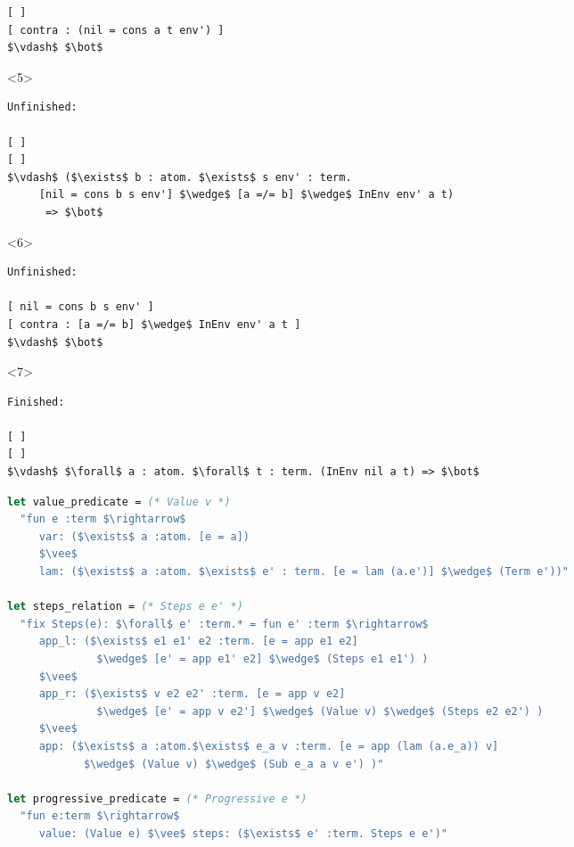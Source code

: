 \documentclass[aspectratio=169]{beamer}
\begin{document}
\begin{frame}[fragile]
\begin{overlayarea}{\linewidth}{2cm}
\begin{onlyenv}
\begin{lstlisting}[mathescape]
[ ]
[ contra : (nil = cons a t env') ]
$\vdash$ $\bot$
\end{lstlisting}
\end{onlyenv}
  \begin{onlyenv}<5>
  \begin{lstlisting}[mathescape]
Unfinished:

[ ]
[ ]
$\vdash$ ($\exists$ b : atom. $\exists$ s env' : term.
     [nil = cons b s env'] $\wedge$ [a =/= b] $\wedge$ InEnv env' a t)
      => $\bot$
\end{lstlisting}
\end{onlyenv}
  \begin{onlyenv}<6>
  \begin{lstlisting}[mathescape]
Unfinished:

[ nil = cons b s env' ]
[ contra : [a =/= b] $\wedge$ InEnv env' a t ]
$\vdash$ $\bot$
\end{lstlisting}
\end{onlyenv}
  \begin{onlyenv}<7>
  \begin{lstlisting}[mathescape]
Finished:

[ ]
[ ]
$\vdash$ $\forall$ a : atom. $\forall$ t : term. (InEnv nil a t) => $\bot$
\end{lstlisting}
\end{onlyenv}
\end{overlayarea}
\end{frame}

\begin{frame}[fragile]
\begin{lstlisting}[mathescape,language=OCaml,escapebegin=\color{codepurple}]
let value_predicate = (* Value v *)
  "fun e :term $\rightarrow$
     var: ($\exists$ a :atom. [e = a])
     $\vee$
     lam: ($\exists$ a :atom. $\exists$ e' : term. [e = lam (a.e')] $\wedge$ (Term e'))"

let steps_relation = (* Steps e e' *)
  "fix Steps(e): $\forall$ e' :term.* = fun e' :term $\rightarrow$
     app_l: ($\exists$ e1 e1' e2 :term. [e = app e1 e2]
              $\wedge$ [e' = app e1' e2] $\wedge$ (Steps e1 e1') )
     $\vee$
     app_r: ($\exists$ v e2 e2' :term. [e = app v e2]
              $\wedge$ [e' = app v e2'] $\wedge$ (Value v) $\wedge$ (Steps e2 e2') )
     $\vee$
     app: ($\exists$ a :atom.$\exists$ e_a v :term. [e = app (lam (a.e_a)) v]
            $\wedge$ (Value v) $\wedge$ (Sub e_a a v e') )"

let progressive_predicate = (* Progressive e *)
  "fun e:term $\rightarrow$
     value: (Value e) $\vee$ steps: ($\exists$ e' :term. Steps e e')"
\end{lstlisting}
\end{frame}
\end{document}
